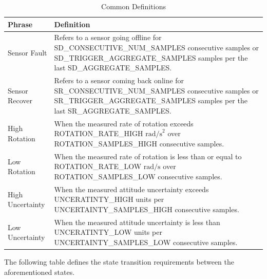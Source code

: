 \documentclass{article}
\begin{document}
            \begin{table}[H]
            \caption{Common Definitions}
            \vspace{4pt}
            \centering
            \renewcommand{\arraystretch}{1.4}
            \begin{tabular}{|l|p{14cm}|}
                \hline
                \textbf{Phrase} & \textbf{Definition} \\ \hline
                Sensor Fault & Refers to a sensor going offline for 
                    SD\_CONSECUTIVE\_NUM\_SAMPLES consecutive samples or 
                    SD\_TRIGGER\_AGGREGATE\_SAMPLES samples per the last 
                    SD\_AGGREGATE\_SAMPLES. \\ \hline
                Sensor Recover & Refers to a sensor coming back online for 
                    SR\_CONSECUTIVE\_NUM\_SAMPLES consecutive samples or 
                    SR\_TRIGGER\_AGGREGATE\_SAMPLES samples per the last 
                    SR\_AGGREGATE\_SAMPLES. \\ \hline
                High Rotation & When the measured rate of rotation exceeds 
                    ROTATION\_RATE\_HIGH $\mathrm{rad/s}^2$ over ROTATION\_SAMPLES\_HIGH 
                    consecutive samples. \\ \hline
                Low Rotation & When the measured rate of rotation is less than
                    or equal to ROTATION\_RATE\_LOW $\mathrm{rad/s}$ over 
                    ROTATION\_SAMPLES\_LOW consecutive samples. \\ \hline
                High Uncertainty & When the measured attitude uncertainty exceeds 
                    UNCERATINTY\_HIGH units per UNCERTAINTY\_SAMPLES\_HIGH 
                    consecutive samples. \\ \hline
                Low Uncertainty & When the measured attitude uncertainty is
                    less than UNCERATINTY\_LOW units per UNCERTAINTY\_SAMPLES\_LOW 
                    consecutive samples. \\ \hline
                \end{tabular}
            \end{table}

            The following table defines the state transition requirements 
            between the aforementioned states.
\end{document}
